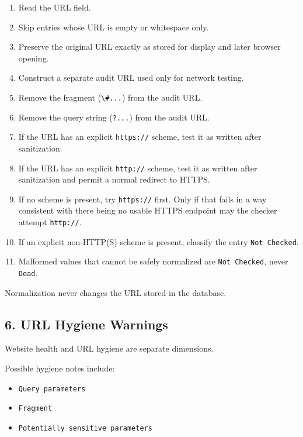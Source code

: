 \documentclass[
  letterpaper,
]{article}
\newcommand{\passthrough}[1]{#1}
\providecommand{\tightlist}{%
  \setlength{\itemsep}{0pt}\setlength{\parskip}{0pt}}
\begin{document}
\begin{enumerate}
\def\labelenumi{\arabic{enumi}.}
\tightlist
\item
  Read the URL field.
\item
  Skip entries whose URL is empty or whitespace only.
\item
  Preserve the original URL exactly as stored for display and later browser opening.
\item
  Construct a separate audit URL used only for network testing.
\item
  Remove the fragment (\passthrough{\lstinline!\#...!}) from the audit URL.
\item
  Remove the query string (\passthrough{\lstinline!?...!}) from the audit URL.
\item
  If the URL has an explicit \passthrough{\lstinline!https://!} scheme, test it as written after sanitization.
\item
  If the URL has an explicit \passthrough{\lstinline!http://!} scheme, test it as written after sanitization and permit
  a normal redirect to HTTPS.
\item
  If no scheme is present, try \passthrough{\lstinline!https://!} first. Only if that fails in a way consistent with
  there being no usable HTTPS endpoint may the checker attempt \passthrough{\lstinline!http://!}.
\item
  If an explicit non-HTTP(S) scheme is present, classify the entry \passthrough{\lstinline!Not Checked!}.
\item
  Malformed values that cannot be safely normalized are \passthrough{\lstinline!Not Checked!}, never
  \passthrough{\lstinline!Dead!}.
\end{enumerate}

Normalization never changes the URL stored in the database.

\subsection{6. URL Hygiene Warnings}\label{6-url-hygiene-warnings}

Website health and URL hygiene are separate dimensions.

Possible hygiene notes include:

\begin{itemize}
\tightlist
\item
  \passthrough{\lstinline!Query parameters!}
\item
  \passthrough{\lstinline!Fragment!}
\item
  \passthrough{\lstinline!Potentially sensitive parameters!}
\end{itemize}
\end{document}
